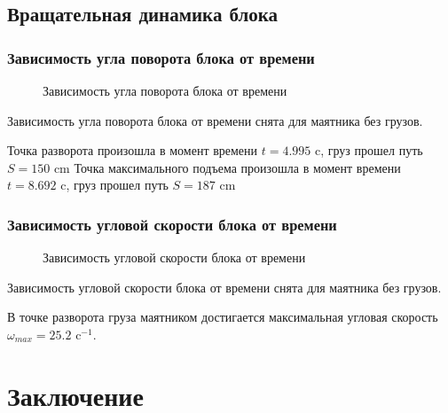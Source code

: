 \documentclass[a4paper,12pt]{article}
\begin{document}
% 	

\subsection{Вращательная динамика блока}
\subsubsection{Зависимость угла поворота блока от времени}
\begin{figure}[H]
	\centering	
	
	\caption{Зависимость угла поворота блока от времени}
	\label{fig:osci}
\end{figure}

Зависимость угла поворота блока от времени снята для маятника без грузов.

Точка разворота произошла в момент времени $t=4.995\text{ c}$, груз прошел путь $S=150\text{ cm}$
Точка максимального подъема произошла в момент времени $t=8.692\text{ c}$, груз прошел путь $S=187\text{ cm}$
\subsubsection{Зависимость угловой скорости блока от времени}
\begin{figure}[H]
	\centering	
	
	\caption{Зависимость угловой скорости блока от времени}
	\label{fig:osci}
\end{figure}
Зависимость угловой скорости блока от времени снята для маятника без грузов.

В точке разворота груза маятником достигается максимальная угловая скорость $\omega_{max}=25.2\text{ c}^{-1}$.

\newpage
\section*{Заключение}
\end{document}
